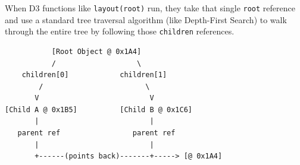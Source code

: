 \documentclass[12pt, a4paper]{article}
\begin{document}
When D3 functions like \texttt{layout(root)} run, they take that single \texttt{root} reference and use a standard tree traversal algorithm (like Depth-First Search) to walk through the entire tree by following those \texttt{children} references.

\begin{codebox}
\begin{verbatim}
           [Root Object @ 0x1A4]
           /                   \
    children[0]            children[1]
        /                        \
       V                          V
[Child A @ 0x1B5]          [Child B @ 0x1C6]
       |                          |
   parent ref                 parent ref
       |                          |
       +------(points back)-------+-----> [@ 0x1A4]
\end{verbatim}
\end{codebox}
\end{document}
